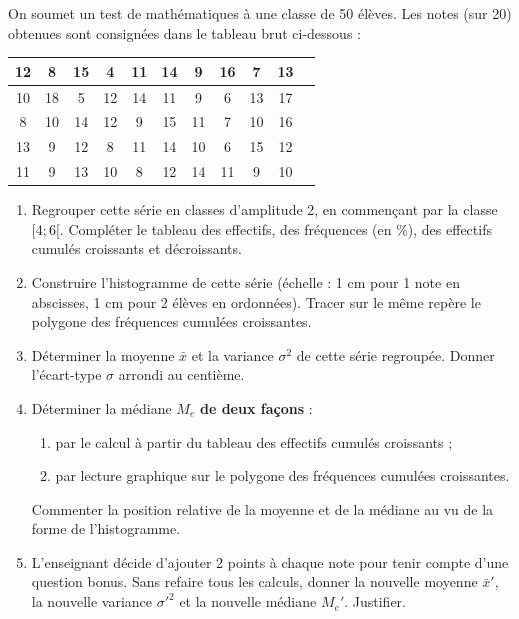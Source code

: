 \documentclass[11pt]{article}
\begin{document}
\begin{exercice}
On soumet un test de mathématiques à une classe de 50 élèves. Les notes (sur 20) obtenues sont consignées dans le tableau brut ci-dessous :
\begin{center}
\begin{tabular}{|c|c|c|c|c|c|c|c|c|c|c|}
\hline
12 & 8 & 15 & 4 & 11 & 14 & 9 & 16 & 7 & 13 \\
\hline
10 & 18 & 5 & 12 & 14 & 11 & 9 & 6 & 13 & 17 \\
\hline
8 & 10 & 14 & 12 & 9 & 15 & 11 & 7 & 10 & 16 \\
\hline
13 & 9 & 12 & 8 & 11 & 14 & 10 & 6 & 15 & 12 \\
\hline
11 & 9 & 13 & 10 & 8 & 12 & 14 & 11 & 9 & 10 \\
\hline
\end{tabular}
\end{center}
\begin{enumerate}
    \item Regrouper cette série en classes d'amplitude 2, en commençant par la classe $[4; 6[$. Compléter le tableau des effectifs, des fréquences (en \%), des effectifs cumulés croissants et décroissants.
    \item Construire l'histogramme de cette série (échelle : 1 cm pour 1 note en abscisses, 1 cm pour 2 élèves en ordonnées). Tracer sur le même repère le polygone des fréquences cumulées croissantes.
    \item Déterminer la moyenne $\bar{x}$ et la variance $\sigma^2$ de cette série regroupée. Donner l'écart-type $\sigma$ arrondi au centième.
    \item Déterminer la médiane $M_e$ \textbf{de deux façons} : 
    \begin{enumerate}
        \item par le calcul à partir du tableau des effectifs cumulés croissants ;
        \item par lecture graphique sur le polygone des fréquences cumulées croissantes.
    \end{enumerate}
    Commenter la position relative de la moyenne et de la médiane au vu de la forme de l'histogramme.
    \item L'enseignant décide d'ajouter 2 points à chaque note pour tenir compte d'une question bonus. Sans refaire tous les calculs, donner la nouvelle moyenne $\bar{x}'$, la nouvelle variance $\sigma'^2$ et la nouvelle médiane $M_e'$. Justifier.
\end{enumerate}
\end{exercice}
\end{document}
